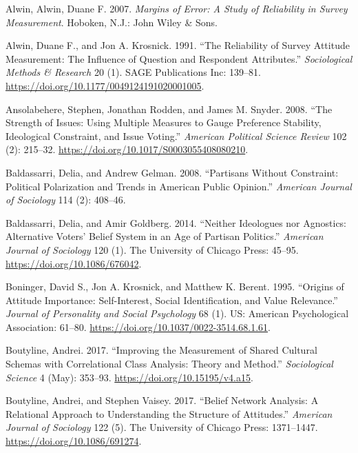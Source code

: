 \documentclass[12pt,]{article}
\begin{document}
\singlespace
\setlength{\parindent}{-0.2in}
\setlength{\leftskip}{0.2in}
\setlength{\parskip}{0pt}

\noindent

\hypertarget{refs}{}
\leavevmode\hypertarget{ref-alwin2007}{}%
Alwin, Alwin, Duane F. 2007. \emph{Margins of Error: A Study of Reliability in Survey Measurement}. Hoboken, N.J.: John Wiley \& Sons.

\leavevmode\hypertarget{ref-alwin1991a}{}%
Alwin, Duane F., and Jon A. Krosnick. 1991. ``The Reliability of Survey Attitude Measurement: The Influence of Question and Respondent Attributes.'' \emph{Sociological Methods \& Research} 20 (1). SAGE Publications Inc: 139--81. \url{https://doi.org/10.1177/0049124191020001005}.

\leavevmode\hypertarget{ref-ansolabehere2008}{}%
Ansolabehere, Stephen, Jonathan Rodden, and James M. Snyder. 2008. ``The Strength of Issues: Using Multiple Measures to Gauge Preference Stability, Ideological Constraint, and Issue Voting.'' \emph{American Political Science Review} 102 (2): 215--32. \url{https://doi.org/10.1017/S0003055408080210}.

\leavevmode\hypertarget{ref-baldassarri2008}{}%
Baldassarri, Delia, and Andrew Gelman. 2008. ``Partisans Without Constraint: Political Polarization and Trends in American Public Opinion.'' \emph{American Journal of Sociology} 114 (2): 408--46.

\leavevmode\hypertarget{ref-baldassarri2014}{}%
Baldassarri, Delia, and Amir Goldberg. 2014. ``Neither Ideologues nor Agnostics: Alternative Voters' Belief System in an Age of Partisan Politics.'' \emph{American Journal of Sociology} 120 (1). The University of Chicago Press: 45--95. \url{https://doi.org/10.1086/676042}.

\leavevmode\hypertarget{ref-boninger1995}{}%
Boninger, David S., Jon A. Krosnick, and Matthew K. Berent. 1995. ``Origins of Attitude Importance: Self-Interest, Social Identification, and Value Relevance.'' \emph{Journal of Personality and Social Psychology} 68 (1). US: American Psychological Association: 61--80. \url{https://doi.org/10.1037/0022-3514.68.1.61}.

\leavevmode\hypertarget{ref-boutyline2017}{}%
Boutyline, Andrei. 2017. ``Improving the Measurement of Shared Cultural Schemas with Correlational Class Analysis: Theory and Method.'' \emph{Sociological Science} 4 (May): 353--93. \url{https://doi.org/10.15195/v4.a15}.

\leavevmode\hypertarget{ref-boutyline2017a}{}%
Boutyline, Andrei, and Stephen Vaisey. 2017. ``Belief Network Analysis: A Relational Approach to Understanding the Structure of Attitudes.'' \emph{American Journal of Sociology} 122 (5). The University of Chicago Press: 1371--1447. \url{https://doi.org/10.1086/691274}.
\end{document}
